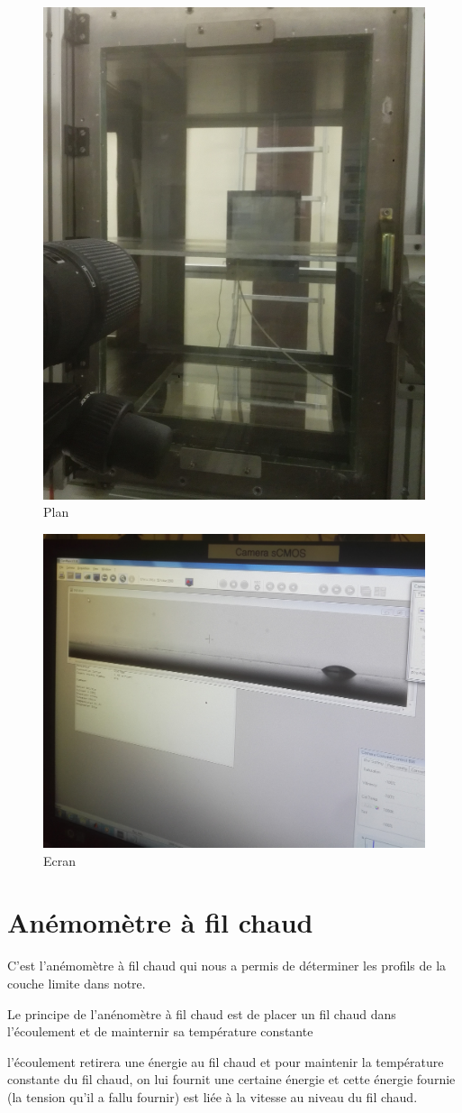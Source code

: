 \documentclass[french]{article}
\begin{document}
\begin{figure}[ht]
\centering
	\includegraphics[width = 0.4\linewidth]{./image/Surface.jpg}
	\caption{Plan}
	\label{fig:Plan}
\end{figure}
\begin{figure}[ht]
\centering
	\includegraphics[width = 0.6\linewidth]{./image/Ecran.jpg}
	\caption{Ecran}
	\label{fig:Ecran}
\end{figure}

\section{Anémomètre à fil chaud}
C'est l'anémomètre à fil chaud qui nous a permis de déterminer les profils de la couche limite dans notre.

Le principe de l'anénomètre à fil chaud est de placer un fil chaud dans l'écoulement et de mainternir sa température constante

l'écoulement retirera une énergie au fil chaud et pour maintenir la température constante du fil chaud, on lui fournit une certaine énergie et cette énergie fournie (la tension qu'il a fallu fournir) est liée à la vitesse au niveau du fil chaud.
\end{document}
